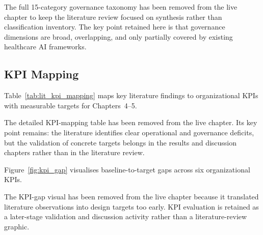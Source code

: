\noindent The full 15-category governance taxonomy has been removed from the live chapter to keep the literature review focused on synthesis rather than classification inventory. The key point retained here is that governance dimensions are broad, overlapping, and only partially covered by existing healthcare AI frameworks.

\subsection{KPI Mapping}

Table~\ref{tab:lit_kpi_mapping} maps key literature findings to organizational KPIs with measurable targets for Chapters~4--5.

The detailed KPI-mapping table has been removed from the live chapter. Its key point remains: the literature identifies clear operational and governance deficits, but the validation of concrete targets belongs in the results and discussion chapters rather than in the literature review.


Figure~\ref{fig:kpi_gap} visualises baseline-to-target gaps across six organizational KPIs.


\noindent The KPI-gap visual has been removed from the live chapter because it translated literature observations into design targets too early. KPI evaluation is retained as a later-stage validation and discussion activity rather than a literature-review graphic.

